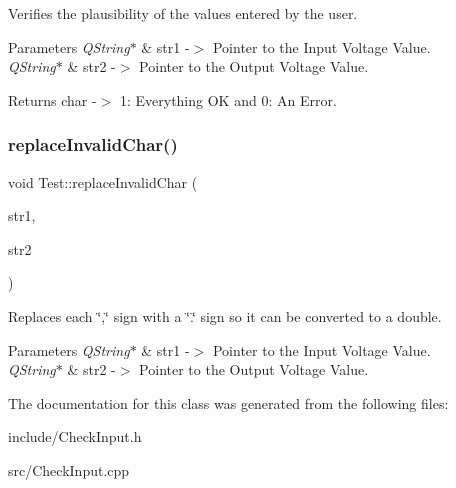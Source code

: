 Verifies the plausibility of the values entered by the user. 


\begin{DoxyParams}{Parameters}
{\em Q\+String$\ast$} & str1 -\/$>$ Pointer to the Input Voltage Value. \\
\hline
{\em Q\+String$\ast$} & str2 -\/$>$ Pointer to the Output Voltage Value. \\
\hline
\end{DoxyParams}
\begin{DoxyReturn}{Returns}
char -\/$>$ 1\+: Everything OK and 0\+: An Error. 
\end{DoxyReturn}
\mbox{\label{classTest_a83a0f09e6583bf623f84f0caa50342d9}} 
\subsubsection{\texorpdfstring{replace\+Invalid\+Char()}{replaceInvalidChar()}}
{\footnotesize\ttfamily void Test\+::replace\+Invalid\+Char (\begin{DoxyParamCaption}\item[{Q\+String \&}]{str1,  }\item[{Q\+String \&}]{str2 }\end{DoxyParamCaption})}



Replaces each \char`\"{},\char`\"{} sign with a \char`\"{}.\char`\"{} sign so it can be converted to a double. 


\begin{DoxyParams}{Parameters}
{\em Q\+String$\ast$} & str1 -\/$>$ Pointer to the Input Voltage Value. \\
\hline
{\em Q\+String$\ast$} & str2 -\/$>$ Pointer to the Output Voltage Value. \\
\hline
\end{DoxyParams}


The documentation for this class was generated from the following files\+:\begin{DoxyCompactItemize}
\item 
include/Check\+Input.\+h\item 
src/Check\+Input.\+cpp\end{DoxyCompactItemize}
